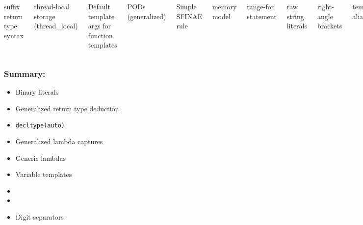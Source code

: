 \begin{frame}[fragile,t]
\begin{columns}[t]
{suffix return type syntax

thread-local storage (thread\_local)

Default template args for function templates

}

{\scriptsize
PODs (generalized)

Simple SFINAE rule

memory model

range-for statement

raw string literals

right-angle brackets

template alias

unicode characters

unions (generalized)

user-defined literals

variadic templates

\vskip 12pt

smart pointers

}
\end{columns}

\end{frame}

\begin{frame}[fragile,t]
\frametitle{Summary: }
\begin{itemize}

\item Binary literals

\item Generalized return type deduction

\item \texttt{decltype(auto)}

\item Generalized lambda captures

\item Generic lambdas

\item Variable templates

\item {}

\item {}

\item Digit separators

\end{itemize}

\end{frame}


